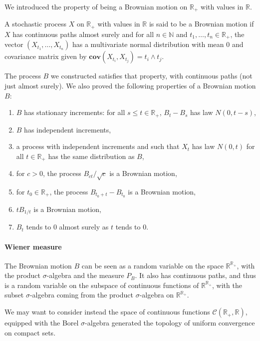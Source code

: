 \documentclass[lean]{Draft}
\makeatletter
\newcommand\leanlink{\begingroup\catcode`\#=12\relax\@leanlink}
\newcommand\@leanlink[2]{\endgroup
\href{#1}
{\texttt{\detokenize{#2}}}}
\newcommand{\docs}[1]{%
\leanlink{https://remydegenne.github.io/brownian-motion/docs/find/?pattern=#1\#doc}
{#1}}
\makeatother
\begin{document}
We introduced the property of being a Brownian motion on $\mathbb{R}_+$ with values in $\mathbb{R}$.

\begin{definition}[\docs{ProbabilityTheory.IsBrownian}]\label{def:IsBrownian}
A stochastic process $X$ on $\mathbb{R}_+$ with values in $\mathbb{R}$ is said to be a Brownian motion if $X$ has continuous paths almost surely and for all $n \in \mathbb{N}$ and $t_1, \ldots, t_n \in \mathbb{R}_+$, the vector $(X_{t_1}, \ldots, X_{t_n})$ has a multivariate normal distribution with mean $0$ and covariance matrix given by $\mathbf{cov}(X_{t_i}, X_{t_j}) = t_i \wedge t_j$.
\end{definition}
The process $B$ we constructed satisfies that property, with continuous paths (not just almost surely).
We also proved the following properties of a Brownian motion $B$:
\begin{enumerate}[noitemsep]
  \item $B$ has stationary increments: for all $s \le t \in \mathbb{R}_+$, $B_t - B_s$ has law $N(0, t - s)$,
  \item $B$ has independent increments,
  \item a process with independent increments and such that $X_t$ has law $N(0,t)$ for all $t \in \mathbb{R}_+$ has the same distribution as $B$,
  \item for $c>0$, the process $B_{ct}/\sqrt{c}$ is a Brownian motion,
  \item for $t_0 \in \mathbb{R}_+$, the process $B_{t_0 + t} - B_{t_0}$ is a Brownian motion,
  \item $t B_{1/t}$ is a Brownian motion,
  \item $B_t$ tends to 0 almost surely as $t$ tends to 0.
\end{enumerate}


\paragraph{Wiener measure}

The Brownian motion $B$ can be seen as a random variable on the space $\mathbb{R}^{\mathbb{R}_+}$, with the product $\sigma$-algebra and the measure $P_B$.
It also has continuous paths, and thus is a random variable on the subspace of continuous functions of $\mathbb{R}^{\mathbb{R}_+}$, with the subset $\sigma$-algebra coming from the product $\sigma$-algebra on $\mathbb{R}^{\mathbb{R}_+}$.

We may want to consider instead the space of continuous functions $\mathcal{C}(\mathbb{R}_+, \mathbb{R})$, equipped with the Borel $\sigma$-algebra generated the topology of uniform convergence on compact sets.
\end{document}
